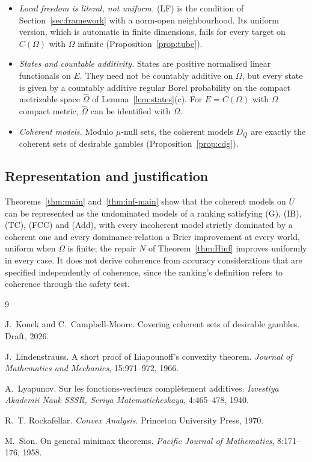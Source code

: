 \documentclass[11pt]{article}
\theoremstyle{plain}
\theoremstyle{definition}
\theoremstyle{remark}
\begin{document}
\begin{itemize}
  \item \emph{Local freedom is literal, not uniform.} (LF) is the condition of
  Section~\ref{sec:framework} with a norm-open neighbourhood. Its uniform version, which
  is automatic in finite dimensions, fails for every target on $C(\Omega)$ with $\Omega$
  infinite (Proposition~\ref{prop:tube}).
  \item \emph{States and countable additivity.} States are positive normalised linear
  functionals on $E$. They need not be countably additive on $\Omega$, but every state is
  given by a countably additive regular Borel probability on the compact metrizable space
  $\hat\Omega$ of Lemma~\ref{lem:states}(c). For $E=C(\Omega)$ with $\Omega$ compact
  metric, $\hat\Omega$ can be identified with $\Omega$.
  \item \emph{Coherent models.} Modulo $\mu$-null sets, the coherent models $D_Q$ are
  exactly the coherent sets of desirable gambles (Proposition~\ref{prop:cdg}).
\end{itemize}

\subsection{Representation and justification}

Theorems~\ref{thm:main} and~\ref{thm:inf-main} show that the coherent models on $U$ can be represented as the
undominated models of a ranking satisfying (G), (IB), (TC), (FCC) and (Add), with every
incoherent model strictly dominated by a coherent one and every dominance relation a Brier
improvement at every world, uniform when $\Omega$ is finite; the repair $N$ of
Theorem~\ref{thm:Hinf} improves uniformly in every case. It does not derive coherence from accuracy considerations that
are specified independently of coherence, since the ranking's definition refers to
coherence through the safety test.

\begin{thebibliography}{9}

J.~Konek and C.~Campbell-Moore.
\newblock Covering coherent sets of desirable gambles.
\newblock Draft, 2026.

J.~Lindenstrauss.
\newblock A short proof of {L}iapounoff's convexity theorem.
\newblock \emph{Journal of Mathematics and Mechanics}, 15:971--972, 1966.

A.~Lyapunov.
\newblock Sur les fonctions-vecteurs compl\`etement additives.
\newblock \emph{Izvestiya Akademii Nauk SSSR, Seriya Matematicheskaya}, 4:465--478,
1940.

R.~T. Rockafellar.
\newblock \emph{Convex Analysis}.
\newblock Princeton University Press, 1970.

M.~Sion.
\newblock On general minimax theorems.
\newblock \emph{Pacific Journal of Mathematics}, 8:171--176, 1958.

\end{thebibliography}
\end{document}
